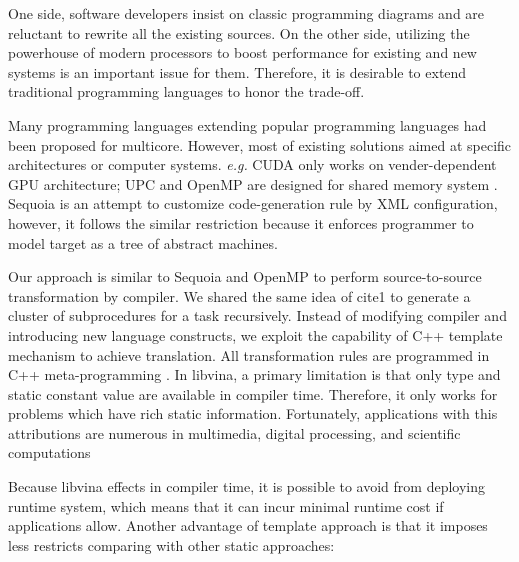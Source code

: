 \documentclass[10pt, conference, compsocconf]{IEEEtran}
\begin{document}
One side, software developers insist on classic programming diagrams and are reluctant to rewrite all the existing sources. On the other side, utilizing the powerhouse of modern processors to boost performance for existing and new systems is an important issue for them. Therefore, it is desirable to extend traditional programming languages to honor the trade-off.

Many programming languages extending popular programming languages had been proposed for multicore. However, most of existing solutions aimed at specific architectures or computer systems. \textit{e.g.} CUDA only works on vender-dependent GPU architecture; UPC and OpenMP are designed for shared memory system \cite{15}. Sequoia \cite{1} is an attempt to customize code-generation rule by XML configuration, however, it follows the similar restriction because it enforces programmer to model target as a tree of abstract machines.

Our approach is similar to Sequoia and OpenMP to perform source-to-source transformation by compiler. We shared the same idea of cite{1} to generate a cluster of subprocedures for a task recursively. Instead of modifying compiler and introducing new language constructs, we exploit the capability of C++ template mechanism to achieve translation. All transformation rules are programmed in C++ meta-programming \cite{10}.  In libvina, a primary limitation is that only type and static constant value are available in compiler time. Therefore, it only works for problems which have rich static information. Fortunately, applications with this attributions are numerous in multimedia, digital processing, and scientific computations 

Because libvina effects in compiler time, it is possible to avoid from deploying runtime system, which means that it can incur minimal runtime cost if applications allow. Another advantage of template approach is that it imposes less restricts comparing with other static approaches:
\end{document}
